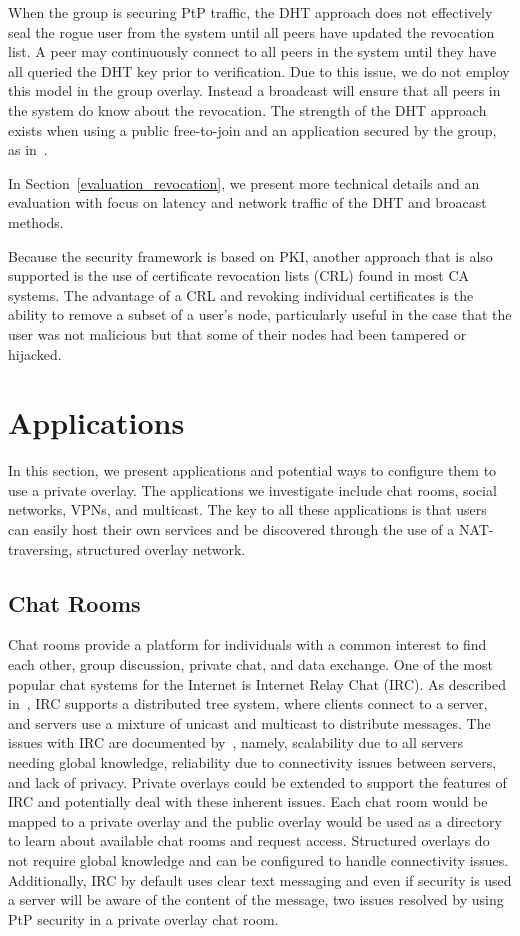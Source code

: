 \documentclass[conference]{IEEEtran}
\begin{document}
When the group is securing PtP traffic, the DHT approach does not effectively
seal the rogue user from the system until all peers have updated the revocation
list.  A peer may continuously connect to all peers in the system until they
have all queried the DHT key prior to verification.  Due to this issue, we do
not employ this model in the group overlay.  Instead a broadcast will ensure
that all peers in the system do know about the revocation.  The strength of
the DHT approach exists when using a public free-to-join and an application
secured by the group, as in~\cite{nsdi10}.

In Section~\ref{evaluation_revocation}, we present more technical details and
an evaluation with focus on latency and network traffic of the DHT and broacast
methods.

Because the security framework is based on PKI, another approach that is also
supported is the use of certificate revocation lists
(CRL) found in most CA systems.  The advantage of a CRL and revoking individual
certificates is the ability to remove a subset of a user's node, particularly
useful in the case that the user was not malicious but that some of their nodes
had been tampered or hijacked.

\section{Applications}
\label{applications}
In this section, we present applications and potential ways to configure them
to use a private overlay.  The applications we investigate include chat rooms,
social networks, VPNs, and multicast.  The key to all these applications is that
users can easily host their own services and be discovered through the use of
a NAT-traversing, structured overlay network.

\subsection{Chat Rooms}
Chat rooms provide a platform for individuals with a common interest to find
each other, group discussion, private chat, and data exchange.  One of the most
popular chat systems for the Internet is Internet Relay Chat (IRC).  As
described in~\cite{irc}, IRC supports a distributed tree system, where clients
connect to a server, and servers use a mixture of unicast and multicast to
distribute messages.  The issues with IRC are documented by~\cite{irc_arch},
namely, scalability due to all servers needing global knowledge, reliability due
to connectivity issues between servers, and lack of privacy.  Private overlays
could be extended to support the features of IRC and potentially deal with these
inherent issues.  Each chat room would be mapped to a private overlay and the
public overlay would be used as a directory to learn about available chat rooms
and request access.  Structured overlays do not require global knowledge and can
be configured to handle connectivity issues.  Additionally, IRC by default uses
clear text messaging and even if security is used a server will be aware of the
content of the message, two issues resolved by using PtP security in a private
overlay chat room.  
\end{document}

